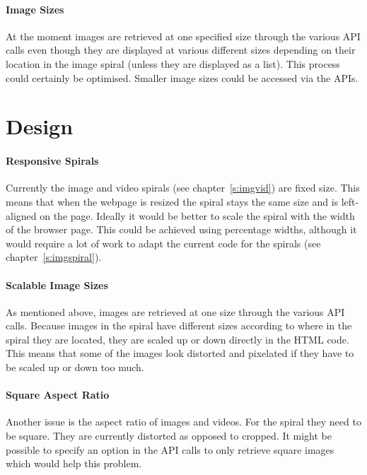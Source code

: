 \paragraph{Image Sizes} 
At the moment images are retrieved at one specified size through the various \ac{API} calls even though they are displayed at various different sizes depending on their location in the image spiral (unless they are displayed as a list). This process could certainly be optimised. Smaller image sizes could be accessed via the \ac{API}s.


\section{Design}
\label{s:designaspi}

\paragraph{Responsive Spirals} 
Currently the image and video spirals (see chapter~\ref{s:imgvid}) are fixed size. This means that when the webpage is resized the spiral stays the same size and is left-aligned on the page. Ideally it would be better to scale the spiral with the width of the browser page. This could be achieved using percentage widths, although it would require a lot of work to adapt the current code for the spirals (see chapter~\ref{s:imgspiral}).

\paragraph{Scalable Image Sizes} 
As mentioned above, images are retrieved at one size through the various \ac{API} calls. Because images in the spiral have different sizes according to where in the spiral they are located, they are scaled up or down directly in the \ac{HTML} code. This means that some of the images look distorted and pixelated if they have to be scaled up or down too much.

\paragraph{Square Aspect Ratio} 
Another issue is the aspect ratio of images and videos. For the spiral they need to be square. They are currently distorted as opposed to cropped. It might be possible to specify an option in the \ac{API} calls to only retrieve square images which would help this problem.

